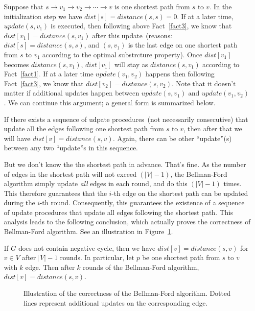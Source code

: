 Suppose that $s \to v_1 \to v_2 \to \cdots \to v$ is one shortest path from $s$ to $v$.
In the initialization step we have $dist[s] = distance(s,s) = 0$. 
If at a later time, $update(s, v_1)$ is executed, then following above Fact~\ref{fact3}, 
we know that $dist[v_1] = distance(s, v_1)$ after this update~(reasons: $dist[s] = distance(s,s)$,
and $(s,v_1)$ is the last edge on one shortest path from $s$ to $v_1$ according to the optimal substrcture property).
Once $dist[v_1]$ becomes $distance(s,v_1)$, $dist[v_1]$ will stay as $distance(s,v_1)$ according to Fact~\ref{fact1}.
If at a later time $update(v_1, v_2)$ happens 
then following Fact~\ref{fact3}, we know that $dist[v_2] = distance(s, v_2)$.
Note that it doesn't matter if additional updates happen between $update(s, v_1)$ and $update(v_1, v_2)$.
We can continue this argument; a general form is summarized below.

\begin{fact}
\label{fact4}
If there exists a sequence of udpate procedures~(not necessarily consecutive) that update all the edges following one shortest path
from $s$ to $v$, then after that we will have $dist[v] = distance(s, v)$.
Again, there can be other ``update''(s) between any two ``update''s in this sequence.
\end{fact}


But we don't know the the shortest path in advance. That's fine.
As the number of edges in the shortest path will not exceed $(|V| - 1)$, the Bellman-Ford algorithm
simply update \emph{all} edges in each round, and do this $(|V| - 1)$ times.
This therefore guarantees that the $i$-th edge on the shortest path can be updated during the $i$-th round.
Consequently, this guarantees the existence of a sequence of update procedures that update all edges following the shortest path.
This analysis leads to the following conclusion, which actually proves the correctness of Bellman-Ford algorithm.
See an illustration in Figure~\ref{fig:bellman}.
\begin{fact}
\label{fact5}
If $G$ does not contain negative cycle,  then we have $dist[v] = distance(s,v)$ for $v\in V$ after $|V| -1$ rounds.
In particular, let $p$ be one shortest path from $s$ to $v$ with $k$ edge.  
Then after $k$ rounds of the Bellman-Ford algorithm, $dist[v] = distance(s,v)$.
\end{fact}

\begin{figure}[h]
\centering{}
\caption{Illustration of the correctness of the Bellman-Ford algorithm.
Dotted lines represent additional updates on the corresponding edge.}
\label{fig:bellman}
\end{figure}



